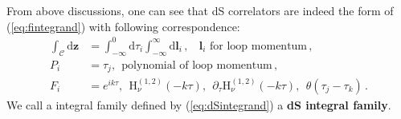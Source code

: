 \documentclass[a4paper,11pt]{article}
\newcommand{\nn}{\nonumber}
\newcommand{\nd}{\mathrm{d}}
\def\eqref#1{(\ref{#1})}
\begin{document}
From above discussions, one can see that dS correlators are indeed the form of
\eqref{eq:fintegrand} with following correspondence: 
\begin{align}
\int_\mathcal{C} \nd \bm{z}&= \int_{-\infty}^0 \nd \tau_i\int_{-\infty}^{\infty} \nd \bm{l}_i \, , 
~~~~\text{$\bm{l}_i$ for loop momentum} \, , %
\nn\\
P_i & = \tau_j, ~~ \text{polynomial of loop momentum} \, , \nn\\
F_i & = e^{i k \tau}, ~~ \text{H}_{\nu}^{(1,2)} (-k \tau), ~~ \partial_{\tau} \text{H}_{\nu}^{(1,2)}(-k \tau), ~~ \theta(\tau_j-\tau_k) \, . \label{eq:dSintegrand}
\end{align}
We call a integral family defined by \eqref{eq:dSintegrand} a \textbf{dS integral family}. 
\end{document}
